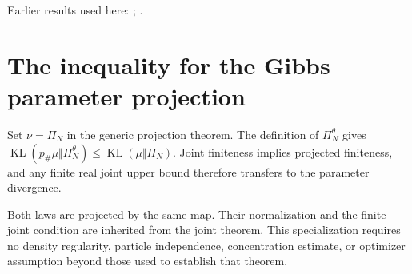 \documentclass[11pt,a4paper]{article}
\begin{document}
Earlier results used here: \cite[Section~3.1.1]{LangevinLean2026IPLA}; \cite[Section~3.1.6]{LangevinLean2026IPLA}.

\section{\texorpdfstring{The inequality for the Gibbs parameter projection}{The inequality for the Gibbs parameter projection}}


Set \(\nu=\Pi_N\) in the generic projection theorem. The definition of \(\Pi_N^\theta\) gives \(\operatorname{KL}(p_\#\mu\Vert\Pi_N^\theta)\le\operatorname{KL}(\mu\Vert\Pi_N)\). Joint finiteness implies projected finiteness, and any finite real joint upper bound therefore transfers to the parameter divergence.



Both laws are projected by the same map. Their normalization and the finite-joint condition are inherited from the joint theorem. This specialization requires no density regularity, particle independence, concentration estimate, or optimizer assumption beyond those used to establish that theorem.
\end{document}

